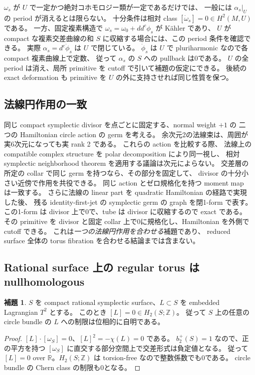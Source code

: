 \documentclass[11pt,a4paper]{article}
\theoremstyle{definition}
\newtheorem{lemma}[theorem]{補題}
\newcommand{\RR}{\mathbb R}
\newcommand{\ZZ}{\mathbb Z}
\begin{document}
$\omega_s$ が $U$ で一定かつ絶対コホモロジー類が一定であるだけでは、
一般には $\alpha_s|_U$ の period が消えるとは限らない。
十分条件は相対 class $[\dot\omega_s]=0\in H^2(M,U)$ である。
一方、固定複素構造で
$\omega_s=\omega_0+dd^c\phi_s$ が Kähler であり、
$U$ が compact な複素交差曲線の和 $S$ に収縮する場合には、この period 条件を確認できる。
実際 $\alpha_s=d^c\dot\phi_s$ は $U$ で閉じている。
$\dot\phi_s$ は $U$ で pluriharmonic なので各 compact 複素曲線上で定数、
従って $\alpha_s$ の $S$ への pullback は0である。
$U$ の全 period は消え、局所 primitive を cutoff で引いて補題の仮定にできる。
後続の exact deformation も primitive を $U$ の外に支持させれば同じ性質を保つ。

\subsection{法線円作用の一致}

同じ compact symplectic divisor を点ごとに固定する、normal weight $+1$ の
二つの Hamiltonian circle action の germ を考える。
余次元2の法線束は、周囲が実6次元になっても実 rank 2 である。
これらの action を比較する際、
法線上の compatible complex structure を polar decomposition により同一視し、
相対 symplectic neighborhood theorem を適用する議論は次元によらない。
交差層の所定の collar で同じ germ を持つなら、その部分を固定して、
divisor の十分小さい近傍で作用を共役できる。
同じ action とゼロ規格化を持つ moment map は一致する。
さらに法線の linear part を quadratic Hamiltonian の経路で実現した後、
残る identity-first-jet の symplectic germ の graph を閉1-form で表す。
この1-form は divisor 上で0で、tube は divisor に収縮するので exact である。
その primitive を divisor と固定 collar 上で0に規格化し、Hamiltonian を外側で cutoff できる。
これは\emph{一つの法線円作用を合わせる}補題であり、
reduced surface 全体の torus fibration を合わせる結論までは含まない。

\subsection{Rational surface 上の regular torus は nullhomologous}

\begin{lemma}\label{lem:null}
$S$ を compact rational symplectic surface、$L\subset S$ を embedded Lagrangian $T^2$ とする。
このとき $[L]=0\in H_2(S;\ZZ)$。
従って $S$ 上の任意の circle bundle の $L$ への制限は位相的に自明である。
\end{lemma}

\begin{proof}
$[L]\cdot[\omega_S]=0$、$[L]^2=-\chi(L)=0$ である。
$b_2^+(S)=1$ なので、正の平方を持つ $[\omega_S]$ に直交する部分空間上で交差形式は負定値となる。
従って $[L]=0$ over $\RR$。$H_2(S;\ZZ)$ は torsion-free なので整数係数でも0である。
circle bundle の Chern class の制限も0となる。
\end{proof}
\end{document}
